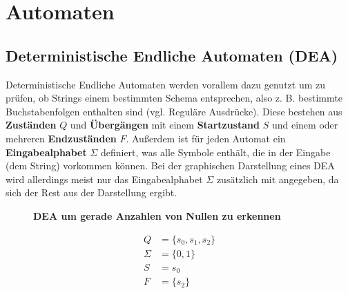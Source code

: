\section{Automaten}

\subsection{Deterministische Endliche Automaten (DEA)}

Deterministische Endliche Automaten werden vorallem dazu genutzt um zu prüfen,
ob Strings einem bestimmten Schema entsprechen, also z. B. bestimmte Buchstabenfolgen
enthalten sind (vgl. Reguläre Ausdrücke).
Diese bestehen aus \textbf{Zuständen} $Q$ und \textbf{Übergängen} mit einem
\textbf{Startzustand} $S$ und einem oder
mehreren \textbf{Endzuständen} $F$. Außerdem ist für jeden Automat
ein \textbf{Eingabealphabet} $\Sigma$ definiert, was alle Symbole enthält,
die in der Eingabe (dem String) vorkommen können.
Bei der graphischen Darstellung eines DEA wird allerdings meist nur das Eingabealphabet
$\Sigma$ zusätzlich mit angegeben, da sich der Rest aus der Darstellung ergibt.

\vspace*{0.5cm}

\begin{figure}[h]
    \centering
    \caption*{\textbf{DEA um gerade Anzahlen von Nullen zu erkennen}}
\end{figure}

\vspace*{-2cm}

\Large
\begin{align*}
    Q & = \{s_0, s_1, s_2\} \\
    \Sigma & = \{0, 1\} \\
    S & = s_0 \\
    F & = \{s_2\}
\end{align*}
\normalsize

